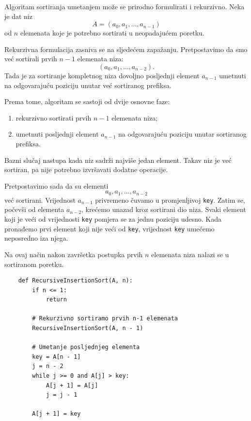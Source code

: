\begin{solution}
    Algoritam sortiranja umetanjem može se prirodno formulirati i rekurzivno.
     Neka je dat niz
 \[
 A = (a_0,a_1,\ldots,a_{n-1})
 \]
 od $n$ elemenata koje je potrebno sortirati u neopadajućem poretku.
 
 Rekurzivna formulacija zasniva se na sljedećem zapažanju. Pretpostavimo da smo
 već sortirali prvih $n-1$ elemenata niza:
 \[
 (a_0,a_1,\ldots,a_{n-2}).
 \]
 Tada je za sortiranje kompletnog niza dovoljno posljednji element
 $a_{n-1}$ umetnuti na odgovarajuću poziciju unutar već sortiranog prefiksa.
 
 Prema tome, algoritam se sastoji od dvije osnovne faze:
 
 \begin{enumerate}
 	\item rekurzivno sortirati prvih $n-1$ elemenata niza;
 	\item umetnuti posljednji element $a_{n-1}$ na odgovarajuću poziciju
 	unutar sortiranog prefiksa.
 \end{enumerate}
 
 Bazni slučaj nastupa kada niz sadrži najviše jedan element. Takav niz je već
 sortiran, pa nije potrebno izvršavati dodatne operacije.
 
 Pretpostavimo sada da su elementi
 \[
 a_0,a_1,\ldots,a_{n-2}
 \]
 već sortirani. Vrijednost $a_{n-1}$ privremeno čuvamo u promjenljivoj
 \texttt{key}. Zatim se, počevši od elementa $a_{n-2}$, krećemo unazad kroz
 sortirani dio niza. Svaki element koji je veći od vrijednosti \texttt{key}
 pomjera se za jednu poziciju udesno. Kada pronađemo prvi element koji nije
 veći od \texttt{key}, vrijednost \texttt{key} umećemo neposredno iza njega.
 
 Na ovaj način nakon završetka postupka prvih $n$ elemenata niza nalazi se u sortiranom poretku.
\end{solution}
 
\begin{verbatim}
	def RecursiveInsertionSort(A, n):
	    if n <= 1:
	        return
	
	    # Rekurzivno sortiramo prvih n-1 elemenata
    	RecursiveInsertionSort(A, n - 1)
	
	    # Umetanje posljednjeg elementa
	    key = A[n - 1]
	    j = n - 2
	    while j >= 0 and A[j] > key:
	        A[j + 1] = A[j]
	        j = j - 1
	
	    A[j + 1] = key
\end{verbatim}


